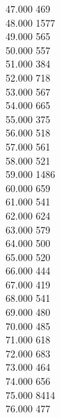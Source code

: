 { 47.000	469 \\
 48.000	1577 \\
 49.000	565 \\
 50.000	557 \\
 51.000	384 \\
 52.000	718 \\
 53.000	567 \\
 54.000	665 \\
 55.000	375 \\
 56.000	518 \\
 57.000	561 \\
 58.000	521 \\
 59.000	1486 \\
 60.000	659 \\
 61.000	541 \\
 62.000	624 \\
 63.000	579 \\
 64.000	500 \\
 65.000	520 \\
 66.000	444 \\
 67.000	419 \\
 68.000	541 \\
 69.000	480 \\
 70.000	485 \\
 71.000	618 \\
 72.000	683 \\
 73.000	464 \\
 74.000	656 \\
 75.000	8414 \\
 76.000	477 \\
}
